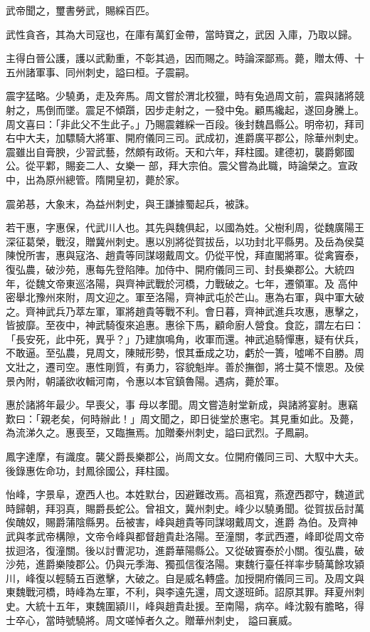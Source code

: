 \begin{pinyinscope}
 武帝聞之，璽書勞武，賜綵百匹。



 武性貪吝，其為大司寇也，在庫有萬釘金帶，當時寶之，武因
 入庫，乃取以歸。



 主得白晉公護，護以武勳重，不彰其過，因而賜之。時論深鄙焉。薨，贈太傅、十五州諸軍事、同州刺史，謚曰桓。子震嗣。



 震字猛略。少驍勇，走及奔馬。周文嘗於渭北校獵，時有兔過周文前，震與諸將競射之，馬倒而墜。震足不傾躓，因步走射之，一發中兔。顧馬纔起，遂回身騰上。周文喜曰：「非此父不生此子。」乃賜震雜綵一百段。後封魏昌縣公。明帝初，拜司右中大夫，加驃騎大將軍、開府儀同三司。武成初，進爵廣平郡公，除華州刺史。震雖出自膏腴，少習武藝，然頗有政術。天和六年，拜柱國。建德初，襲爵鄭國公。從平鄴，賜妾二人、女樂一
 部，拜大宗伯。震父嘗為此職，時論榮之。宣政中，出為原州總管。隋開皇初，薨於家。



 震弟惎，大象末，為益州刺史，與王謙據蜀起兵，被誅。



 若干惠，字惠保，代武川人也。其先與魏俱起，以國為姓。父樹利周，從魏廣陽王深征葛榮，戰沒，贈冀州刺史。惠以別將從賀拔岳，以功封北平縣男。及岳為侯莫陳悅所害，惠與寇洛、趙貴等同謀翊戴周文。仍從平悅，拜直閣將軍。從禽竇泰，復弘農，破沙苑，惠每先登陷陣。加侍中、開府儀同三司、封長樂郡公。大統四年，從魏文帝東巡洛陽，與齊神武戰於河橋，力戰破之。七年，遷領軍。及
 高仲密舉北豫州來附，周文迎之。軍至洛陽，齊神武屯於芒山。惠為右軍，與中軍大破之。齊神武兵乃萃左軍，軍將趙貴等戰不利。會日暮，齊神武進兵攻惠，惠擊之，皆披靡。至夜中，神武騎復來追惠。惠徐下馬，顧命廚人營食。食訖，謂左右曰：「長安死，此中死，異乎？」乃建旗鳴角，收軍而還。神武追騎憚惠，疑有伏兵，不敢逼。至弘農，見周文，陳賊形勢，恨其垂成之功，虧於一簣，噓唏不自勝。周文壯之，遷司空。惠性剛質，有勇力，容貌魁岸。善於撫御，將士莫不懷恩。及侯景內附，朝議欲收輯河南，令惠以本官鎮魯陽。遇病，薨於軍。



 惠於諸將年最少。早喪父，事
 母以孝聞。周文嘗造射堂新成，與諸將宴射。惠竊歎曰：「親老矣，何時辦此！」周文聞之，即日徙堂於惠宅。其見重如此。及薨，為流涕久之。惠喪至，又臨撫焉。加贈秦州刺史，謚曰武烈。子鳳嗣。



 鳳字達摩，有識度。襲父爵長樂郡公，尚周文女。位開府儀同三司、大馭中大夫。後錄惠佐命功，封鳳徐國公，拜柱國。



 怡峰，字景阜，遼西人也。本姓默台，因避難改焉。高祖寬，燕遼西郡守，魏道武時歸朝，拜羽真，賜爵長蛇公。曾祖文，冀州刺史。峰少以驍勇聞。從賀拔岳討萬俟醜奴，賜爵蒲陰縣男。岳被害，峰與趙貴等同謀翊戴周文，進爵
 為伯。及齊神武與孝武帝構隙，文帝令峰與都督趙貴赴洛陽。至潼關，孝武西遷，峰即從周文帝拔迴洛，復潼關。後以討曹泥功，進爵華陽縣公。又從破竇泰於小關。復弘農，破沙苑，進爵樂陵郡公。仍與元季海、獨孤信復洛陽。東魏行臺任祥率步騎萬餘攻潁川，峰復以輕騎五百邀擊，大破之。自是威名轉盛。加授開府儀同三司。及周文與東魏戰河橋，時峰為左軍，不利，與李遠先還，周文遂班師。詔原其罪。拜夏州刺史。大統十五年，東魏圍潁川，峰與趙貴赴援。至南陽，病卒。峰沈毅有膽略，得士卒心，當時號驍將。周文嗟悼者久之。贈華州刺史，
 謚曰襄威。




\end{pinyinscope}
